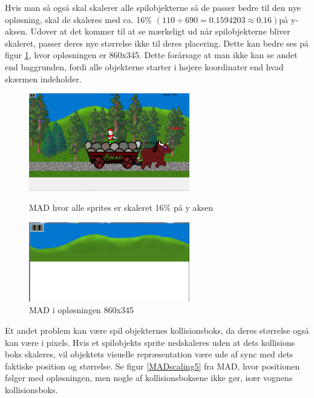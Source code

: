\documentclass[Main.tex]{PositionOgSkalering}
\begin{document}
Hvis man så også skal skalerer alle spilobjekterne så de passer bedre til den nye opløsning, skal de skaleres med ca. 16\% \begin{math} (110 \div 690  = 0.1594203 \approx 0.16) \end{math}på y-aksen. Udover at det kommer til at se mærkeligt ud når spilobjekterne bliver skaleret, passer deres nye størrelse ikke til deres placering. Dette kan bedre ses på figur \ref{MADscaling4}, hvor opløsningen er 860x345. Dette forårsage at man ikke kan se andet end baggrunden, fordi alle objekterne starter i højere koordinater end hvad skærmen indeholder.

\begin{figure}[h]
\centering
\parbox{7cm}{   
\includegraphics[width = 7cm]{billeder/MADscaling3}
\caption{MAD hvor alle sprites er skaleret 16\% på y aksen}    
\label{MADscaling3}}
\qquad
\begin{minipage}{7cm}
\includegraphics[width = 7cm]{billeder/MADscaling4}
\caption{MAD i opløsningen 860x345}    
\label{MADscaling4}
\end{minipage}
\end{figure}

Et andet problem kan være spil objekternes kollisionsboks, da deres størrelse også kan være i pixels. Hvis et spilobjekts sprite nedskaleres uden at dets kollisions boks skaleres, vil objektets visuelle repræsentation være ude af sync med dets faktiske position og størrelse. Se figur \ref{MADscaling5} fra MAD, hvor positionen følger med opløsningen, men nogle af kollisionsboksene ikke gør, især vognens kollisionsboks. 
\end{document}
